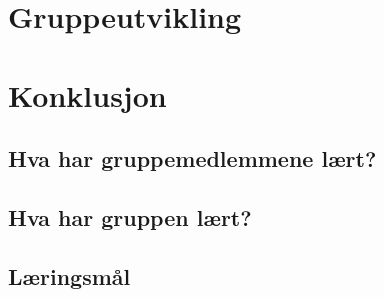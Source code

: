 \documentclass[DIV=calc, paper=a4, fontsize=12pt]{scrartcl}	 %
\begin{document}



\section{Gruppeutvikling}







%




\section{Konklusjon}


\subsection{Hva har gruppemedlemmene lært?}



\subsection{Hva har gruppen lært?}



\subsection{Læringsmål}




\onecolumn
\small{

}


\pagebreak


\end{document}
